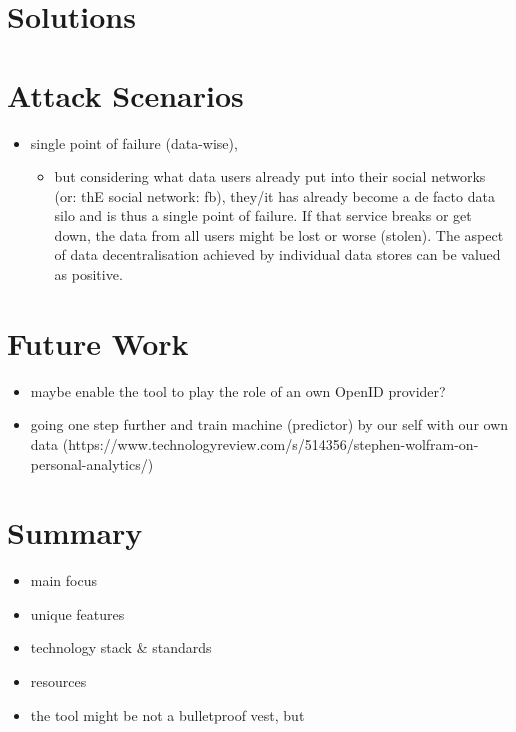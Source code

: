 \documentclass[12pt,english,a4paper,titlepage,cleardoublepage=empty,dottedtoc]{report}
\providecommand{\tightlist}{%
  \setlength{\itemsep}{0pt}\setlength{\parskip}{0pt}}
\begin{document}
\section{Solutions}\label{solutions}

\section{Attack Scenarios}\label{attack-scenarios}

\begin{itemize}
\tightlist
\item
  single point of failure (data-wise),

  \begin{itemize}
  \tightlist
  \item
    but considering what data users already put into their social
    networks (or: thE social network: fb), they/it has already become a
    de facto data silo and is thus a single point of failure. If that
    service breaks or get down, the data from all users might be lost or
    worse (stolen). The aspect of data decentralisation achieved by
    individual data stores can be valued as positive.
  \end{itemize}
\end{itemize}

\section{Future Work}\label{future-work}

\begin{itemize}
\tightlist
\item
  maybe enable the tool to play the role of an own OpenID provider?
\item
  going one step further and train machine (predictor) by our self with
  our own data
  (https://www.technologyreview.com/s/514356/stephen-wolfram-on-personal-analytics/)
\end{itemize}

\section{Summary}\label{summary}

\begin{itemize}
\tightlist
\item
  main focus
\item
  unique features
\item
  technology stack \& standards
\item
  resources
\item
  the tool might be not a bulletproof vest, but
\end{itemize}
\end{document}
